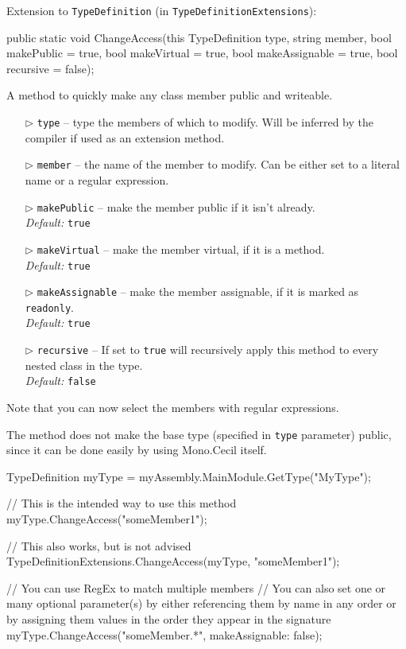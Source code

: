 \documentclass[a4paper,11pt]{article}
\begin{document}
\begin{mdef}
Extension to \texttt{TypeDefinition} (in \texttt{TypeDefinitionExtensions}):
\begin{cs}
public static void ChangeAccess(this TypeDefinition type,
                                string member,
                                bool makePublic = true,
                                bool makeVirtual = true,
                                bool makeAssignable = true,
                                bool recursive = false);
\end{cs}
A method to quickly make any class member public and writeable.
\begin{itemize}
\item[$\triangleright$] \texttt{type} -- type the members of which to modify. Will be inferred by the compiler if used as an extension method.
\item[$\triangleright$] \texttt{member} -- the name of the member to modify. Can be either set to a literal name or a regular expression.
\item[$\triangleright$] \texttt{makePublic} -- make the member public if it isn't already.
\\ \textit{Default:} \texttt{true}
\item[$\triangleright$] \texttt{makeVirtual} -- make the member virtual, if it is a method.
\\ \textit{Default:} \texttt{true}
\item[$\triangleright$] \texttt{makeAssignable} -- make the member assignable, if it is marked as \texttt{readonly}.
\\ \textit{Default:} \texttt{true}
\item[$\triangleright$] \texttt{recursive} -- If set to \texttt{true} will recursively apply this method to every nested class in the type.
\\ \textit{Default:} \texttt{false}
\end{itemize}
Note that you can now select the members with regular expressions.
\newline

The method does not make the base type (specified in \texttt{type} parameter) public, since it can be done easily by using Mono.Cecil itself.
\begin{cs}
TypeDefinition myType = myAssembly.MainModule.GetType("MyType");

// This is the intended way to use this method
myType.ChangeAccess("someMember1");

// This also works, but is not advised
TypeDefinitionExtensions.ChangeAccess(myType, "someMember1");

// You can use RegEx to match multiple members
// You can also set one or many optional parameter(s) by either referencing them by name in any order or by assigning them values in the order they appear in the signature
myType.ChangeAccess("someMember.*", makeAssignable: false);
\end{cs}
\end{mdef}
\end{document}
